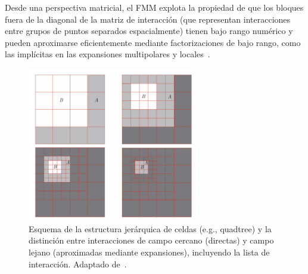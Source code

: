 Desde una perspectiva matricial, el FMM explota la propiedad de que los bloques fuera de la diagonal de la matriz de interacción (que representan interacciones entre grupos de puntos separados espacialmente) tienen bajo rango numérico y pueden aproximarse eficientemente mediante factorizaciones de bajo rango, como las implícitas en las expansiones multipolares y locales~\cite{ChenSF, Martinsson2012}.

\begin{figure}[H]
    \centering
    \includegraphics[width=0.65\textwidth]{img/marcoTeorico/fmm_esquema.png}
    \caption{Esquema de la estructura jerárquica de celdas (e.g., quadtree) y la distinción entre interacciones de campo cercano (directas) y campo lejano (aproximadas mediante expansiones), incluyendo la lista de interacción. Adaptado de~\cite{GreengardRokhlin1987, Ying2012}.}%
    \label{fig:fmm_hierarchy}
\end{figure}

